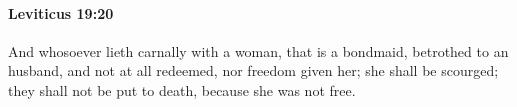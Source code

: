 
		\paragraph{Leviticus 19:20} %
			\label{LEVITICUS-19-20}

			And whosoever lieth carnally with a woman, that is a bondmaid, betrothed to an husband, and not at all redeemed, nor freedom given her; she shall be scourged; they shall not be put to death, because she was not free.


